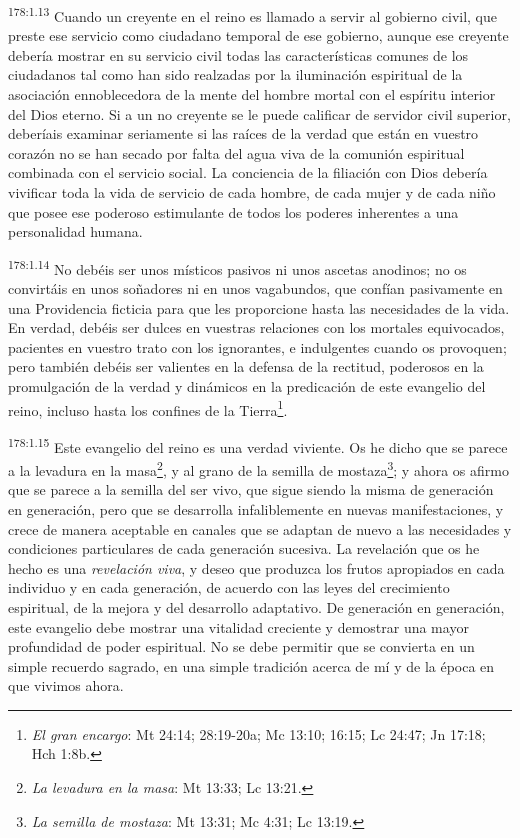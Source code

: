 \par
\textsuperscript{178:1.13} Cuando un creyente en el reino es llamado a servir al gobierno civil, que preste ese servicio como ciudadano temporal de ese gobierno, aunque ese creyente debería mostrar en su servicio civil todas las características comunes de los ciudadanos tal como han sido realzadas por la iluminación espiritual de la asociación ennoblecedora de la mente del hombre mortal con el espíritu interior del Dios eterno. Si a un no creyente se le puede calificar de servidor civil superior, deberíais examinar seriamente si las raíces de la verdad que están en vuestro corazón no se han secado por falta del agua viva de la comunión espiritual combinada con el servicio social. La conciencia de la filiación con Dios debería vivificar toda la vida de servicio de cada hombre, de cada mujer y de cada niño que posee ese poderoso estimulante de todos los poderes inherentes a una personalidad humana.

\par
\textsuperscript{178:1.14} No debéis ser unos místicos pasivos ni unos ascetas anodinos; no os convirtáis en unos soñadores ni en unos vagabundos, que confían pasivamente en una Providencia ficticia para que les proporcione hasta las necesidades de la vida. En verdad, debéis ser dulces en vuestras relaciones con los mortales equivocados, pacientes en vuestro trato con los ignorantes, e indulgentes cuando os provoquen; pero también debéis ser valientes en la defensa de la rectitud, poderosos en la promulgación de la verdad y dinámicos en la predicación de este evangelio del reino, incluso hasta los confines de la Tierra\footnote{\textit{El gran encargo}: Mt 24:14; 28:19-20a; Mc 13:10; 16:15; Lc 24:47; Jn 17:18; Hch 1:8b.}.

\par
\textsuperscript{178:1.15} Este evangelio del reino es una verdad viviente. Os he dicho que se parece a la levadura en la masa\footnote{\textit{La levadura en la masa}: Mt 13:33; Lc 13:21.}, y al grano de la semilla de mostaza\footnote{\textit{La semilla de mostaza}: Mt 13:31; Mc 4:31; Lc 13:19.}; y ahora os afirmo que se parece a la semilla del ser vivo, que sigue siendo la misma de generación en generación, pero que se desarrolla infaliblemente en nuevas manifestaciones, y crece de manera aceptable en canales que se adaptan de nuevo a las necesidades y condiciones particulares de cada generación sucesiva. La revelación que os he hecho es una \textit{revelación viva}, y deseo que produzca los frutos apropiados en cada individuo y en cada generación, de acuerdo con las leyes del crecimiento espiritual, de la mejora y del desarrollo adaptativo. De generación en generación, este evangelio debe mostrar una vitalidad creciente y demostrar una mayor profundidad de poder espiritual. No se debe permitir que se convierta en un simple recuerdo sagrado, en una simple tradición acerca de mí y de la época en que vivimos ahora.


